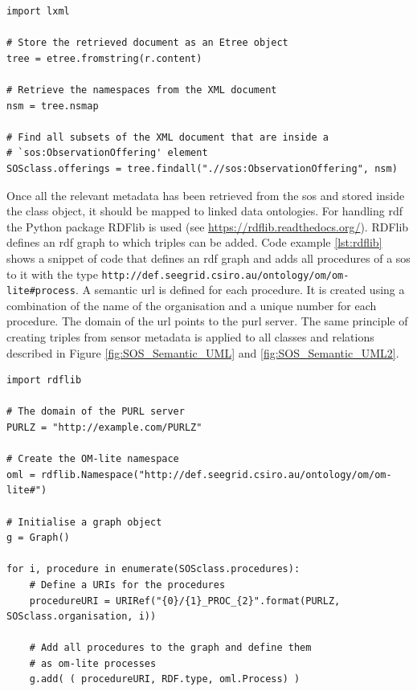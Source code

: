 \begin{lstlisting}[float,caption={Creating an Etree object from an XML response document using Python's LXML library}, label={lst:LXML}]
import lxml

# Store the retrieved document as an Etree object
tree = etree.fromstring(r.content)

# Retrieve the namespaces from the XML document
nsm = tree.nsmap

# Find all subsets of the XML document that are inside a   
# `sos:ObservationOffering' element 
SOSclass.offerings = tree.findall(".//sos:ObservationOffering", nsm)

\end{lstlisting}   
\begin{sloppypar}
Once all the relevant metadata has been retrieved from the \ac{sos} and stored inside the class object, it should be mapped to linked data ontologies. For handling \ac{rdf} the Python package RDFlib is used (see \url{https://rdflib.readthedocs.org/}).  RDFlib defines an \ac{rdf} graph to which triples can be added. Code example \ref{lst:rdflib} shows a snippet of code that defines an \ac{rdf} graph and adds all procedures of a \ac{sos} to it with the type \texttt{http://def.seegrid.csiro.au/ontology/om/om-lite\#process}. A semantic \ac{url} is defined for each procedure. It is created using a combination of the name of the organisation and a unique number for each procedure. The domain of the \ac{url} points to the \ac{purl} server. The same principle of creating triples from sensor metadata is applied to all classes and relations described in Figure \ref{fig:SOS_Semantic_UML} and \ref{fig:SOS_Semantic_UML2}. 
\end{sloppypar}


\begin{lstlisting}[float,caption={Creating an RDF graph object with the Python package RDFlib}, label={lst:rdflib}]
import rdflib

# The domain of the PURL server
PURLZ = "http://example.com/PURLZ"

# Create the OM-lite namespace 
oml = rdflib.Namespace("http://def.seegrid.csiro.au/ontology/om/om-lite#")

# Initialise a graph object
g = Graph()

for i, procedure in enumerate(SOSclass.procedures):
	# Define a URIs for the procedures
	procedureURI = URIRef("{0}/{1}_PROC_{2}".format(PURLZ, SOSclass.organisation, i))
	
	# Add all procedures to the graph and define them   
	# as om-lite processes
	g.add( ( procedureURI, RDF.type, oml.Process) )

\end{lstlisting}  

